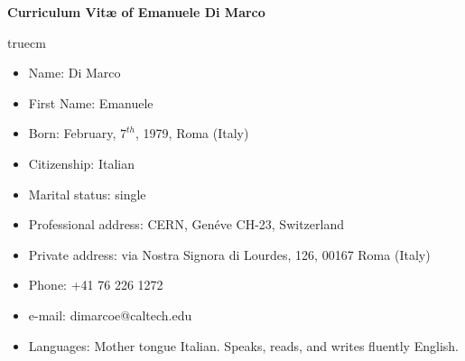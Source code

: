 \documentclass[11pt,twoside,a4paper]{article}
\begin{document}
\large
\centerline{\bf Curriculum Vit\ae{} of Emanuele Di Marco}
 truecm


\begin{itemize} 
\item  Name:  Di Marco
\item  First Name: Emanuele
\item  Born: February, $7^{th}$, 1979, Roma (Italy)
\item  Citizenship: Italian
\item  Marital status: single
\item  Professional address: CERN, Gen\'eve CH-23, Switzerland
\item  Private address: via Nostra Signora di Lourdes, 126, 00167 Roma (Italy)
\item  Phone: +41 76 226 1272
\item  e-mail: dimarcoe@caltech.edu
\item  Languages: Mother tongue Italian. Speaks, reads, and writes fluently English. 
\end{itemize}
\end{document}
